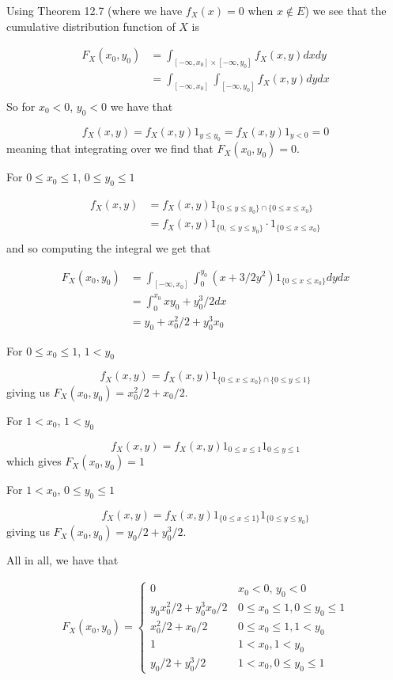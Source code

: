 
Using Theorem 12.7 (where we have $ f_{X} (x) = 0$ when $ x\notin E$) we see that the cumulative
distribution function of $ X$ is 

\begin{align*}
    F_{X} (x_0, y_0) &= \int_{[-\infty,x_0] \times [-\infty, y_0]}^{} f_{X} (x,y) dx dy\\
		     &= \int_{[-\infty,x_0] } \int_{[-\infty, y_0]}^{} f_{X} (x,y) dy dx\\
\end{align*}
So for $ x_0 < 0 $, $ y_0 < 0$ we have that 

\[
    f_{X} (x,y) = f_{X} (x,y) 1_{y \leq y_0} = f_{X} (x,y) 1_{y < 0} = 0
\] 
meaning that integrating over we find that $ F_{X} (x_0,y_0) = 0$.

For $ 0 \leq x_0 \leq 1$, $ 0 \leq y_0 \leq 1$

\begin{align*}
    f_{X} (x,y) &= f_{X} (x,y) 1_{ \{ 0 \leq y \leq y_0 \} \cap \{ 0 \leq x \leq x_0 \} }\\
		&= f_{X} (x,y) 1_{ \{ 0, \leq y \leq y_0 \} } \cdot 1_{ \{ 0 \leq x \leq x_0 \} } \\
\end{align*}
and so computing the integral we get that

\begin{align*}
    F_{X} (x_0, y_0) &= \int_{[-\infty,x_0]}^{} \int_{0}^{y_0} (x+3/2 y^2) 1_{ \{ 0 \leq x \leq x_0
    \} } dy dx\\
		     &= \int_{0}^{x_0} xy_0 + y_0^{3}/2 dx\\
		     &= y_0 + x_0^2/2 + y_0^{3} x_0 
\end{align*}

For $ 0 \leq x_0 \leq 1$, $ 1 < y_0$

\[
    f_{X} (x,y) = f_{X} (x,y) 1_{ \{ 0 \leq x \leq x_0 \} \cap \{ 0 \leq y \leq 1 \} } 
\] 
giving us $ F_{X} (x_0,y_0) = x_0^2/2 + x_0/2$.

For $ 1 < x_0 $, $ 1 < y_0$

\[
    f_{X} (x,y) = f_{X} (x,y) 1_{0 \leq x \leq 1} 1_{0 \leq y \leq 1} 
\] 
which gives $ F_{X} (x_0,y_0) = 1$ 

For $ 1 < x_0$, $ 0\leq y_0 \leq 1$

\[
    f_{X} (x,y) = f_{X} (x,y) 1_{ \{ 0 \leq x \leq 1 \} } 1_{ \{ 0 \leq y \leq y_0 \} } 
\] 
giving us $ F_{X} (x_0,y_0) = y_0/2 + y_0^{3}/2$.

All in all, we have that 

\begin{align*}
    F_{X} (x_0,y_0) = 
    \begin{cases}
	0 &\, x_0< 0, \, y_0< 0\\
	y_0 x_0^2/2 + y_0^{3} x_0/2 &\, 0 \leq x_0 \leq 1, 0 \leq y_0 \leq 1\\
	x_0^2/2 + x_0/2 &\, 0 \leq x_0 \leq 1, 1 < y_0\\
	1 &\, 1 < x_0, 1 < y_0\\
	y_0/2 + y_0^{3}/2 &\, 1<x_0, 0 \leq y_0 \leq 1
    \end{cases}
\end{align*}
